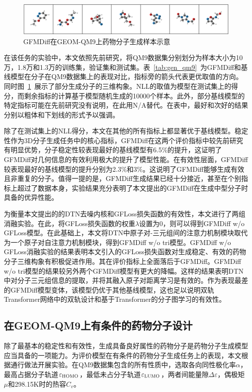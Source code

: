 \begin{figure}[h]
    \centering
    \includegraphics[width=\linewidth]{figures/samples_qm9.png}
    \caption{GFMDiff在GEOM-QM9上药物分子生成样本示意}
    \label{fig:samples_qm9}
\end{figure}

在该任务的实验中，本文依照先前研究，将QM9数据集分别划分为样本大小为10万，1.8万和1.3万的训练集，验证集和测试集。表~\ref{tab:gen_qm9}~为GFMDiff和基线模型在分子在QM9数据集上的表现对比，指标旁的箭头代表更优取值的方向。同时图~\ref{fig:samples_qm9}~展示了部分生成分子的三维构象。NLL的取值为模型在测试集上的得分，而剩余指标的计算基于模型随机生成的10000个样本。此外，部分基线模型的特定指标可能在先前研究没有说明，在此用N/A替代。在表中，最好和次好的结果分别以粗体和下划线的形式予以强调。

除了在测试集上的NLL得分，本文在其他的所有指标上都显著优于基线模型。稳定性作为3D分子生成任务中的核心指标，GFMDiff在这两个评价指标中较先前研究有明显优势，分子稳定性较表现最好的基线模型有6.5\%的提升，这证明了GFMDiff对几何信息的有效利用极大的提升了模型性能。在有效性层面，GFMDiff较表现最好的基线模型的提升分别为2.3\%和3\%。这说明了GFMDiff能够生成有效且非重复的分子。值得一提的是，GFMDiff生成结果已经十分接近，甚至在个别指标上超过了数据本身，实验结果充分表明了本文提出的GFMDiff在生成中型分子时具备的优异性能。

为衡量本文提出的的DTN去噪内核和GFLoss损失函数的有效性，本文进行了两组消融实验。在此，将GFLoss损失函数的权重$\lambda$设置为0，则可以得到GFMDiff w/o GFLoss模型。在此基础上，本文将DTN中原子对-三元组间的注意力机制模块取代为一个原子对自注意力机制模块，得到GFMDiff w/o tri模型。GFMDiff w/o GFLoss消融实验的结果表明本文引入的GFLoss损失函数对生成稳定、有效的药物分子三维构象有积极促进作用。其在评价指标上全面落后于GFMDiff。GFMDiff w/o tri模型的结果较另外两个GFMDiff模型有更大的降幅。这样的结果表明DTN中对分子三元组信息的提取，并将其融入原子对距离学习是有效的。作为表现最差的GFMDiff模型变体，该模型仍优于其他基线模型，这也足以说明双轨Transformer网络中的双轨设计和基于Transformer的分子图学习的有效性。

\subsection{在GEOM-QM9上有条件的药物分子设计}
除了最基本的稳定性和有效性，生成具备良好属性的药物分子是药物分子生成模型应当具备的一项能力。为评价模型在有条件的药物分子生成任务上的表现，本文根据通行做法开展实验。在QM9数据集包含的所有性质中，选取各向同性极化率$\alpha$，最高占据分子轨道$\varepsilon_{{\rm HOMO}}$，最低未占分子轨道$\varepsilon_{{\rm LUMO}}$，两者间能量隙$\Delta \varepsilon$，偶极矩$\mu$和298.15K时的热容$C_v$。

